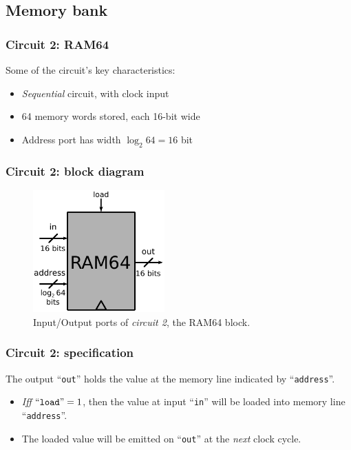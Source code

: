 \documentclass{beamer}
\begin{document}
        \subsection{Memory bank}
        \label{subsec:memory-bank}
            \begin{frame}
                \frametitle{Circuit 2: RAM64}

                \par{Some of the circuit's key characteristics:}

                \begin{itemize}
                    \item \emph{Sequential} circuit, with clock input
                    \item 64 memory words stored, each 16-bit wide
                    \item Address port has width $\log_{2} 64 = 16$ bit
                \end{itemize}
            \end{frame}

            \begin{frame}
                \frametitle{Circuit 2: block diagram}

                \begin{figure}[h!]
                    \centerline{\includegraphics[width=0.45\textwidth]{imgs/ram-block.pdf}}
                    \caption{Input/Output ports of \emph{circuit 2}, the RAM64 block.
                        \label{fig:ram-block}}
                \end{figure}
            \end{frame}

            \begin{frame}
                \frametitle{Circuit 2: specification}

                \par{The output ``\texttt{out}'' holds the value at the memory line indicated by ``\texttt{address}''.}

                \begin{itemize}
                    \item \emph{Iff} $\text{``\texttt{load}''} = 1$,
                        then the value at input ``\texttt{in}'' will be loaded into memory line ``\texttt{address}''.
                    \item The loaded value will be emitted on ``\texttt{out}'' at the \emph{next} clock cycle.
                \end{itemize}
            \end{frame}
\end{document}
